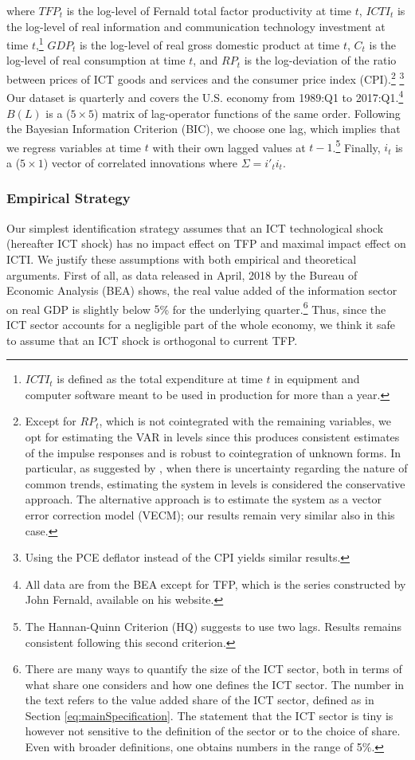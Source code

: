 \documentclass[12pt]{article}
\begin{document}
where $TFP_t$ is the log-level of Fernald total factor productivity at time $t$, $ICTI_{t}$ is the log-level of real information and communication technology investment at time $t$,\footnote{$ICTI_t$ is defined as the total expenditure at time $t$ in equipment and computer software meant to be used in production for more than a year.} $GDP_t$ is the log-level of real gross domestic product at time $t$, $C_t$ is the log-level of real consumption at time $t$, and $RP_t$ is the log-deviation of the ratio between prices of ICT goods and services and the consumer price index (CPI).\footnote{Except for $RP_t$, which is not cointegrated with the remaining variables, we opt for estimating the VAR in levels since this produces consistent estimates of the impulse responses and is robust to cointegration of unknown forms. In particular, as suggested by \cite{hamilton1994time}, when there is uncertainty regarding the nature of common trends, estimating the system in levels is considered the conservative approach. The alternative approach is to estimate the system as a vector error correction model (VECM); our results remain very similar also in this case.} \footnote{Using the PCE deflator instead of the CPI yields similar results.} Our dataset is quarterly and covers the U.S. economy from 1989:Q1 to 2017:Q1.\footnote{All data are from the BEA except for TFP, which is the series constructed by John Fernald, available on his website.} $B(L)$ is a ($5\times 5$) matrix of lag-operator functions of the same order. Following the Bayesian Information Criterion (BIC), we choose one lag, which implies that we regress variables at time $t$ with their own lagged values at $t-1$.\footnote{The Hannan-Quinn Criterion (HQ) suggests to use two lags. Results remains consistent following this second criterion.} Finally, $i_t$ is a ($5 \times 1$) vector of correlated innovations where $\Sigma = i'_t i_t$.

\subsubsection{Empirical Strategy}\label{section:empiricalstrategy_simple}


Our simplest identification strategy assumes that an ICT technological shock (hereafter ICT shock) has no impact effect on TFP and maximal impact effect on ICTI. We justify these assumptions with both empirical and theoretical arguments. First of all, as data released in April, 2018 by the Bureau of Economic Analysis (BEA) shows, the real value added of the information sector on real GDP is slightly below $5$\% for the underlying quarter.\footnote{There are many ways to quantify the size of the ICT sector, both in terms of what share one considers and how one defines the ICT sector. The number in the text refers to the value added share of the ICT sector, defined as in Section \ref{eq:mainSpecification}. The statement that the ICT sector is tiny is however not sensitive to the definition of the sector or to the choice of share. Even with broader definitions, one obtains numbers in the range of 5\%.} Thus, since the ICT sector accounts for a negligible part of the whole economy, we think it safe to assume that an ICT shock is orthogonal to current TFP. 
\end{document}
